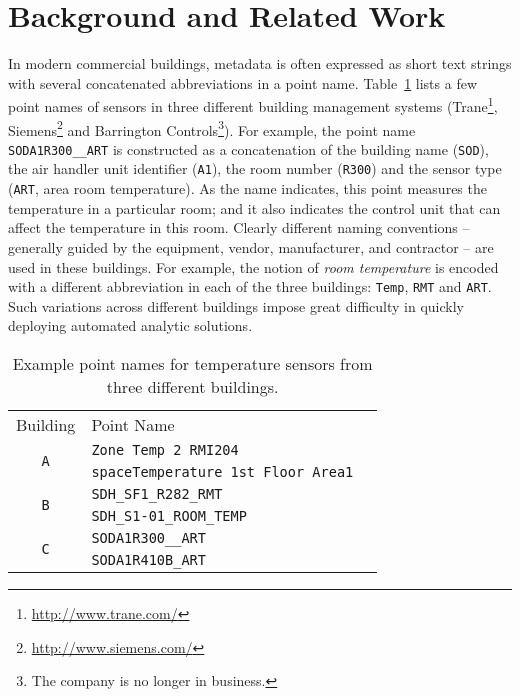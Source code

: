 \section{Background and Related Work}
In modern commercial buildings,
metadata is often expressed as short
text strings with several concatenated abbreviations in a point name. Table~\ref{table:ex} lists
a few point names of sensors in three different building management systems
(Trane\footnote{\url{http://www.trane.com/}}, Siemens\footnote{\url{http://www.siemens.com/}}
and Barrington Controls\footnote{The company is no longer in business.}).
For example, the point name \texttt{SODA1R300\_\_ART} is constructed as a
concatenation of the building name (\texttt{SOD}), the air handler unit
identifier (\texttt{A1}), the room number (\texttt{R300}) and the sensor type
(\texttt{ART}, area room temperature). As the name indicates, this point measures
the temperature in a particular room; and it also indicates the control unit that
can affect the temperature in this room. Clearly different naming conventions --
generally guided by the equipment, vendor, manufacturer,
and contractor --
are used in these buildings. For example, the notion of {\em room temperature} is encoded
with a different abbreviation in each of the three buildings: \texttt{Temp}, \texttt{RMT} and \texttt{ART}.
Such variations across different buildings impose great difficulty in quickly deploying automated analytic
solutions.

\begin{table}[h]
\centering
\begin{tabular}{c|ll}
\cline{1-2}
Building & Point Name & \\
\cline{1-2}
\multirow{2}{*}{\texttt{A}}  & \texttt{Zone Temp 2 RMI204} &  \\
					& \texttt{spaceTemperature 1st Floor Area1} &  \\ \cline{1-2}
\multirow{2}{*}{\texttt{B}} & \texttt{SDH\_SF1\_R282\_RMT} &  \\
                     & \texttt{SDH\_S1-01\_ROOM\_TEMP} &  \\ \cline{1-2}
\multirow{2}{*}{\texttt{C}}  & \texttt{SODA1R300\_\_ART} &  \\
					  & \texttt{SODA1R410B\_ART} &  \\ \cline{1-2}
\end{tabular}
\caption{Example point names for temperature sensors from three different buildings.}
\label{table:ex}
\end{table}


